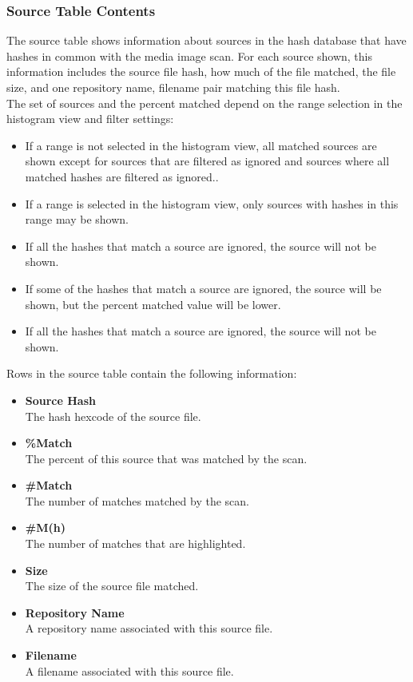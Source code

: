 \documentclass[11pt,fleqn]{article} %
\begin{document}
\subsubsection{Source Table Contents}
The source table shows information about sources in the hash database that have hashes in common with the media image scan. For each source shown, this information includes the source file hash, how much of the file matched, the file size, and one repository name, filename pair matching this file hash.\\

The set of sources and the percent matched depend on the range selection in the histogram view and filter settings:
\begin{itemize}
\item If a range is not selected in the histogram view, all matched sources are shown except for sources that are filtered as ignored and sources where all matched hashes are filtered as ignored..
\item If a range is selected in the histogram view, only sources with hashes in this range may be shown.
\item If all the hashes that match a source are ignored, the source will not be shown.
\item If some of the hashes that match a source are ignored, the source will be shown, but the percent matched value will be lower.
\item If all the hashes that match a source are ignored, the source will not be shown.
\end{itemize}
Rows in the source table contain the following information:
\begin{itemize}
\item \textbf{Source Hash}\\
The hash hexcode of the source file.
\item \textbf{\%Match}\\
The percent of this source that was matched by the scan.
\item \textbf{\#Match}\\
The number of matches matched by the scan.
\item \textbf{\#M(h)}\\
The number of matches that are highlighted.
\item \textbf{Size}\\
The size of the source file matched.
\item \textbf{Repository Name}\\
A repository name associated with this source file.
\item \textbf{Filename}\\
A filename associated with this source file.
\end{itemize}
\end{document}
